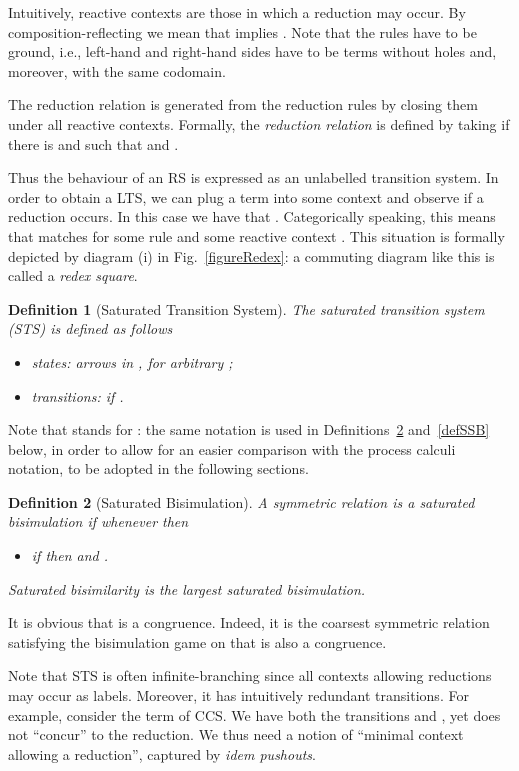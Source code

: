 \documentclass[copyright,creativecommons]{eptcs}
\newcommand{\<}{\langle}
\renewcommand{\>}{\rangle}
\newtheorem{definition}{Definition}{}
\begin{document}
Intuitively, reactive contexts are those in which a reduction may
occur. By composition-reflecting we mean that  implies .  Note that the rules have to
be ground, i.e., left-hand and right-hand sides have to be terms
without holes and, moreover, with the same codomain.

The reduction relation is generated from the reduction rules by
closing them under all reactive contexts.  Formally, the
\emph{reduction relation} is defined by taking  if there
is  and  such that
 and .

Thus the behaviour of an RS is expressed as an unlabelled transition
system.
In order to obtain a LTS, we can plug a term  into some context  and observe if a reduction occurs. In this case we have that . Categorically speaking, this means that  matches  for some rule  and some reactive context . This situation is formally depicted by diagram (i) in Fig.~\ref{figureRedex}: a commuting diagram like this is called a \emph{redex square}.

\begin{definition}[Saturated Transition System]
  The \emph{saturated transition system} (STS) is defined as
  follows \begin{itemize} \item states: arrows  in
  , for arbitrary ; \item transitions:  if .  \end{itemize}
\end{definition}

Note that  stands for : the same notation is
used in Definitions~\ref{defSB} and~\ref{defSSB} below, in order to
allow for an easier comparison with the process calculi notation, to
be adopted in the following sections.



\begin{definition}[Saturated Bisimulation]\label{defSB}
A symmetric relation  is a \emph{saturated
bisimulation} if whenever  then 
\begin{itemize}
\item if  then  and .
\end{itemize}
\emph{Saturated bisimilarity}  is the largest saturated bisimulation.
\end{definition}

It is obvious that  is a congruence. Indeed, it is the
coarsest symmetric relation satisfying the bisimulation game on
 that is also a congruence.


Note that STS is often infinite-branching since all contexts
allowing reductions may occur as labels.  Moreover, it has intuitively
redundant
transitions.  For example, consider the term  of CCS. We have
both the transitions  and
, yet 
does not ``concur'' to the reduction. We thus need a notion of
``minimal context allowing a reduction'', captured by \emph{idem
pushouts}.
\end{document}
